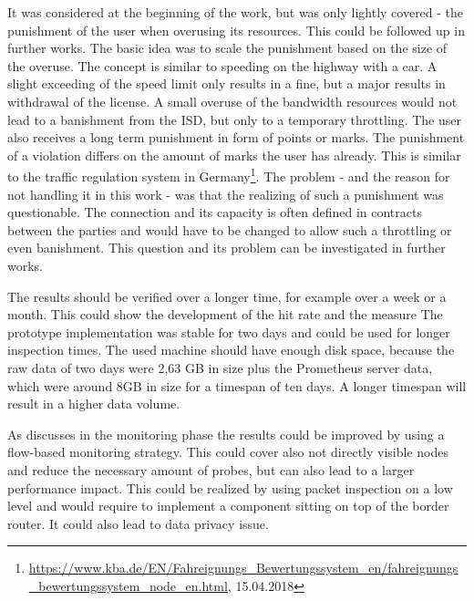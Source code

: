 \documentclass[thesis.tex]{subfiles}
\begin{document}
It was considered at the beginning of the work, but was only lightly covered - the punishment of the user when overusing its resources. This could be followed up in further works. The basic idea was to scale the punishment based on the size of the overuse. The concept is similar to speeding on the highway with a car. A slight exceeding of the speed limit only results in a fine, but a major results in withdrawal of the license. A small overuse of the bandwidth resources would not lead to a banishment from the ISD, but only to a temporary throttling. The user also receives a long term punishment in form of points or marks. The punishment of a violation differs on the amount of marks the user has already. This is similar to the traffic regulation system in Germany\footnote{\url{https://www.kba.de/EN/Fahreignungs_Bewertungssystem_en/fahreignungs_bewertungssystem_node_en.html}, 15.04.2018}. The problem - and the reason for not handling it in this work - was that the realizing of such a punishment was questionable. The connection and its capacity is often defined in contracts between the parties and would have to be changed to allow such a throttling or even banishment. This question and its problem can be investigated in further works.

The results should be verified over a longer time, for example over a week or a month. This could show the development of the hit rate and the measure The prototype implementation was stable for two days and could be used for longer inspection times. The used machine should have enough disk space, because the raw data of two days were 2,63 GB in size plus the Prometheus server data, which were around 8GB in size for a timespan of ten days. A longer timespan will result in a higher data volume. 

As discusses in the monitoring phase the results could be improved by using a flow-based monitoring strategy. This could cover also not directly visible nodes and reduce the necessary amount of probes, but can also lead to a larger performance impact. This could be realized by using packet inspection on a low level and would require to implement a component sitting on top of the border router. It could also lead to data privacy issue.

\subfilebib %
\end{document}
